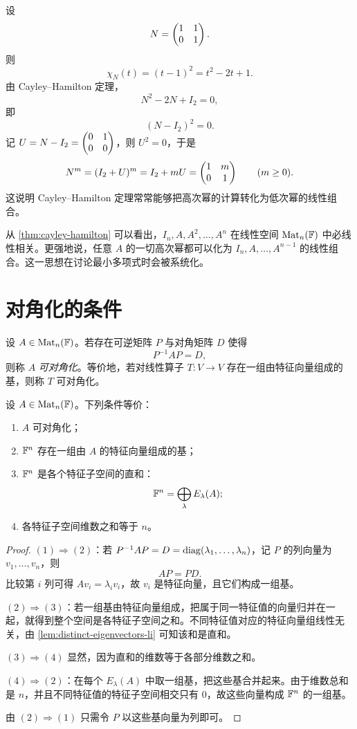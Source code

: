 \begin{example}
设
\[
N=\begin{pmatrix} 1&1\\0&1 \end{pmatrix}.
\]
则
\[
\chi_N(t)=(t-1)^2=t^2-2t+1.
\]
由 Cayley--Hamilton 定理，
\[
N^2-2N+I_2=0,
\]
即
\[
(N-I_2)^2=0.
\]
记 \(U=N-I_2=\begin{pmatrix} 0&1\\0&0 \end{pmatrix}\)，则 \(U^2=0\)，于是
\[
N^m=(I_2+U)^m=I_2+mU=\begin{pmatrix} 1&m\\0&1 \end{pmatrix}
\qquad (m\ge 0).
\]
这说明 Cayley--Hamilton 定理常常能够把高次幂的计算转化为低次幂的线性组合。
\end{example}

\begin{remark}
从 \cref{thm:cayley-hamilton} 可以看出，\(I_n,A,A^2,\dots,A^n\) 在线性空间 \(\mathrm{Mat}_n(\mathbb{F})\) 中必线性相关。更强地说，任意 \(A\) 的一切高次幂都可以化为 \(I_n,A,\dots,A^{n-1}\) 的线性组合。这一思想在讨论最小多项式时会被系统化。
\end{remark}

\section{对角化的条件}\label{sec:diagonalization}

\begin{definition}
设 \(A\in \mathrm{Mat}_n(\mathbb{F})\)。若存在可逆矩阵 \(P\) 与对角矩阵 \(D\) 使得
\[
P^{-1}AP=D,
\]
则称 \(A\) \emph{可对角化}。等价地，若对线性算子 \(T\colon V\to V\) 存在一组由特征向量组成的基，则称 \(T\) 可对角化。
\end{definition}

\begin{theorem}\label{thm:diag-criterion-basis}
设 \(A\in \mathrm{Mat}_n(\mathbb{F})\)。下列条件等价：
\begin{enumerate}[label=(\arabic*), leftmargin=2.4em]
  \item \(A\) 可对角化；
  \item \(\mathbb{F}^n\) 存在一组由 \(A\) 的特征向量组成的基；
  \item \(\mathbb{F}^n\) 是各个特征子空间的直和：
  \[
  \mathbb{F}^n=\bigoplus_{\lambda} E_\lambda(A);
  \]
  \item 各特征子空间维数之和等于 \(n\)。
\end{enumerate}
\end{theorem}

\begin{proof}
\((1)\Rightarrow(2)\)：若 \(P^{-1}AP=D=\mathrm{diag}(\lambda_1,\dots,\lambda_n)\)，记 \(P\) 的列向量为 \(v_1,\dots,v_n\)，则
\[
AP=PD.
\]
比较第 \(i\) 列可得 \(Av_i=\lambda_iv_i\)，故 \(v_i\) 是特征向量，且它们构成一组基。

\((2)\Rightarrow(3)\)：若一组基由特征向量组成，把属于同一特征值的向量归并在一起，就得到整个空间是各特征子空间之和。不同特征值对应的特征向量组线性无关，由 \cref{lem:distinct-eigenvectors-li} 可知该和是直和。

\((3)\Rightarrow(4)\) 显然，因为直和的维数等于各部分维数之和。

\((4)\Rightarrow(2)\)：在每个 \(E_\lambda(A)\) 中取一组基，把这些基合并起来。由于维数总和是 \(n\)，并且不同特征值的特征子空间相交只有 \(0\)，故这些向量构成 \(\mathbb{F}^n\) 的一组基。

由 \((2)\Rightarrow(1)\) 只需令 \(P\) 以这些基向量为列即可。
\end{proof}

